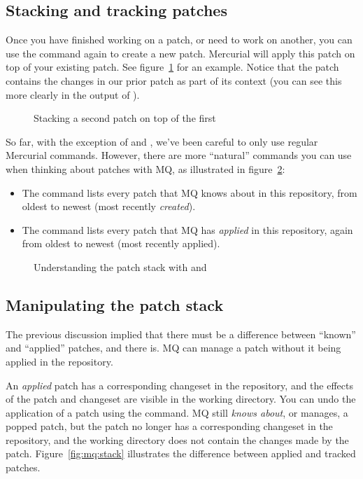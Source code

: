 \subsection{Stacking and tracking patches}

Once you have finished working on a patch, or need to work on another,
you can use the  command again to create a new patch.
Mercurial will apply this patch on top of your existing patch.  See
figure~\ref{ex:mq:qnew2} for an example.  Notice that the patch
contains the changes in our prior patch as part of its context (you
can see this more clearly in the output of ).

\begin{figure}[ht]
  \caption{Stacking a second patch on top of the first}
  \label{ex:mq:qnew2}
\end{figure}

So far, with the exception of  and , we've
been careful to only use regular Mercurial commands.  However, there
are more ``natural'' commands you can use when thinking about patches
with MQ, as illustrated in figure~\ref{ex:mq:qseries}:

\begin{itemize}
\item The  command lists every patch that MQ knows
  about in this repository, from oldest to newest (most recently
  \emph{created}).
\item The  command lists every patch that MQ has
  \emph{applied} in this repository, again from oldest to newest (most
  recently applied).
\end{itemize}

\begin{figure}[ht]
  \caption{Understanding the patch stack with  and
    }
  \label{ex:mq:qseries}
\end{figure}

\subsection{Manipulating the patch stack}

The previous discussion implied that there must be a difference
between ``known'' and ``applied'' patches, and there is.  MQ can
manage a patch without it being applied in the repository.

An \emph{applied} patch has a corresponding changeset in the
repository, and the effects of the patch and changeset are visible in
the working directory.  You can undo the application of a patch using
the  command.  MQ still \emph{knows about}, or manages, a
popped patch, but the patch no longer has a corresponding changeset in
the repository, and the working directory does not contain the changes
made by the patch.  Figure~\ref{fig:mq:stack} illustrates the
difference between applied and tracked patches.

